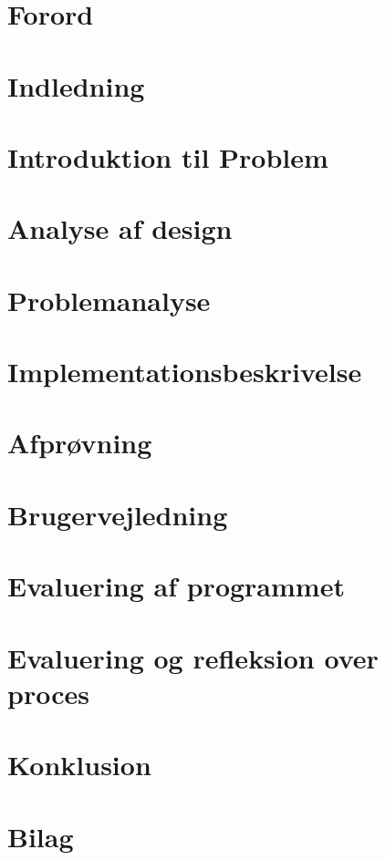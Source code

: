 



	\tableofcontents* %
	\newpage

	\chapter{Forord}
	

	\chapter{Indledning}
	

	\chapter{Introduktion til Problem}
	

	\chapter{Analyse af design}
	

	\chapter{Problemanalyse}
	

	\chapter{Implementationsbeskrivelse}
	

	\chapter{Afprøvning}
	

	\chapter{Brugervejledning}
	

	\chapter{Evaluering af programmet}
	

	\chapter{Evaluering og refleksion over proces}
	

	\chapter{Konklusion}
	

	\chapter{Bilag}

